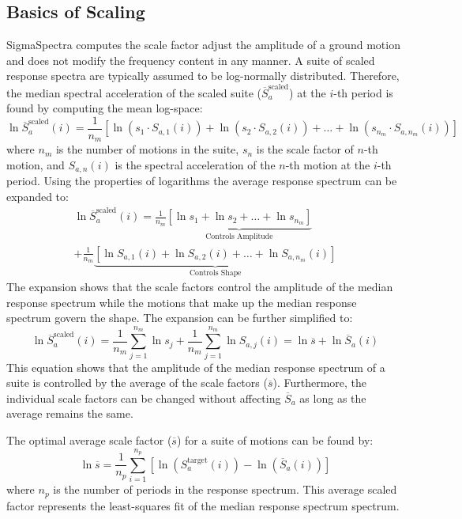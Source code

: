 \documentclass[11pt]{article}
\begin{document}
\subsection{Basics of Scaling}\label{sec:method:basics}

SigmaSpectra computes the scale factor adjust the amplitude of a ground motion and does
not modify the frequency content in any manner.
A suite of scaled response spectra are typically assumed to be
log-normally distributed. Therefore, the median spectral acceleration of the
scaled suite ($\overline{S}_a^\text{scaled}$) at the $i$-th period is found
by computing the mean log-space:
\begin{displaymath}
	\ln \overline{S}_a^\text{scaled}(i) = \frac{1}{n_m} \left[ \ln\left( s_{1}
	\cdot S_{a,1}(i) \right) + \ln\left( s_{2} \cdot S_{a,2}(i) \right) + \dots
	+ \ln\left( s_{n_m} \cdot S_{a,n_m}(i) \right) \right]
\end{displaymath}
where $n_m$ is the number of motions in the suite, $s_n$ is the scale factor of
$n$-th motion, and $S_{a,n}(i)$ is the spectral acceleration of the $n$-th motion
at the $i$-th period. Using the properties of logarithms the average response
spectrum can be expanded to:
\begin{multline*}
	\ln \overline{S}_a^\text{scaled}(i) = \frac{1}{n_m} \underbrace{\left[ \ln
	s_1 + \ln s_2 + \dots + \ln s_{n_m} \right]}_\text{Controls Amplitude} \\
	+ \frac{1}{n_m} \underbrace{\left[ \ln S_{a,1}(i) + \ln S_{a,2}(i) + \dots + \ln
	S_{a,n_m}(i) \right]}_\text{Controls Shape}
\end{multline*}
The expansion shows that the scale factors control the amplitude of the median
response spectrum while the motions that make up the median response spectrum
govern the shape. The expansion can be further simplified to:
\begin{displaymath}
    \ln \overline{S}_a^\text{scaled}(i) = \frac{1}{n_m} \sum_{j=1}^{n_m} \ln s_j +
	\frac{1}{n_m} \sum_{j=1}^{n_m} \ln S_{a,j}(i) = \ln \overline{s} + \ln
	\overline{S}_a(i)
\end{displaymath}
This equation shows that the amplitude of the median response spectrum  of a
suite is controlled by the average of the scale factors ($\overline{s}$).
Furthermore, the individual scale factors can be changed without affecting
$\overline{S}_a$ as long as the average remains the same.

The optimal average scale factor ($\overline{s}$) for a suite of motions can
be found by:
\begin{displaymath}
	\ln \overline{s} = \frac{1}{n_p} \sum_{i=1}^{n_p}\left[ \ln\left(
	S_a^\text{target}(i) \right) - \ln\left( \overline{S}_a(i) \right) \right]
\end{displaymath}
where $n_p$ is the number of periods in the response spectrum. This average
scaled factor represents the least-squares fit of the median response spectrum
spectrum.
\end{document}
